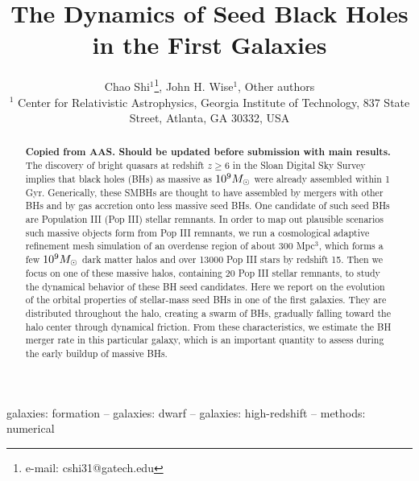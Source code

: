\documentclass[useAMS,usenatbib]{mn2e}
\begin{document}
\title[Seed Black Holes in the First Galaxies]{The Dynamics of Seed
  Black Holes in the First Galaxies}

\author[C. Shi et al.]{Chao Shi$^1$\thanks{e-mail:
    cshi31@gatech.edu}, John H. Wise$^1$, Other authors\\
  $^{1}$ Center for Relativistic Astrophysics, Georgia Institute of
  Technology, 837 State Street, Atlanta, GA
  30332, USA\\
}
\pagerange{\pageref{firstpage}--\pageref{lastpage}} 

\maketitle
\label{firstpage}

\begin{abstract}

  \textbf{Copied from AAS.  Should be updated before submission with
    main results.} The discovery of bright quasars at redshift $z \ge
  6$ in the Sloan Digital Sky Survey implies that black holes (BHs) as
  massive as $10^9 \Ms$ were already assembled within 1
  Gyr. Generically, these SMBHs are thought to have assembled by
  mergers with other BHs and by gas accretion onto less massive seed
  BHs. One candidate of such seed BHs are Population III (Pop III)
  stellar remnants. In order to map out plausible scenarios such
  massive objects form from Pop III remnants, we run a cosmological
  adaptive refinement mesh simulation of an overdense region of about
  300 Mpc$^3$, which forms a few $10^9 \Ms$ dark matter halos and over
  13000 Pop III stars by redshift 15. Then we focus on one of these
  massive halos, containing 20 Pop III stellar remnants, to study the
  dynamical behavior of these BH seed candidates. Here we report on
  the evolution of the orbital properties of stellar-mass seed BHs in
  one of the first galaxies. They are distributed throughout the halo,
  creating a swarm of BHs, gradually falling toward the halo center
  through dynamical friction. From these characteristics, we estimate
  the BH merger rate in this particular galaxy, which is an important
  quantity to assess during the early buildup of massive BHs.

\end{abstract}

\begin{keywords}
  galaxies: formation -- galaxies: dwarf -- galaxies: high-redshift --
  methods: numerical
\end{keywords}
\end{document}
